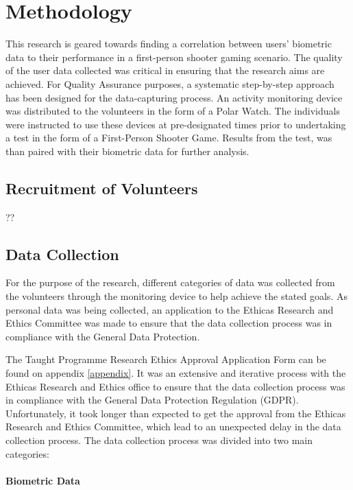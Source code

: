 \chapter{Methodology}

This research is geared towards finding a correlation between users' biometric data to their performance in a first-person shooter gaming scenario. The quality of the user data 
collected was critical in ensuring that the research aims are achieved. For Quality Assurance purposes, a systematic step-by-step approach has been designed for the data-capturing 
process. An activity monitoring device was distributed to the volunteers in the form of a Polar Watch. The individuals were instructed to use these devices at pre-designated times 
prior to undertaking a test in the form of a First-Person Shooter Game. Results from the test, was than paired with their biometric data for further analysis.

\section{Recruitment of Volunteers}
??



\section{Data Collection}

For the purpose of the research, different categories of data was collected from the volunteers through the monitoring device to help achieve the stated goals. As personal data was
being collected, an application to the Ethicas Research and Ethics Committee was made to ensure that the data collection process was in compliance with the General Data Protection.

\par 
The Taught Programme Research Ethics Approval Application Form can be found on appendix \ref{appendix}. It was an extensive and iterative process with the Ethicas Research and Ethics 
office to ensure that the data collection process was in compliance with the General Data Protection Regulation (GDPR). Unfortunately, it took longer than expected to get the approval
from the Ethicas Research and Ethics Committee, which lead to an unexpected delay in the data collection process. The data collection process was divided into two main categories:

\subsubsection*{Biometric Data}

